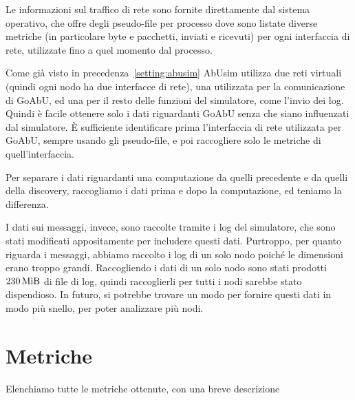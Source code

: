 \documentclass[target=bach]{thud}
\begin{document}
Le informazioni sul traffico di rete sono fornite direttamente dal sistema operativo, che offre degli pseudo-file per processo dove sono listate diverse metriche (in particolare byte e pacchetti, inviati e ricevuti) per ogni interfaccia di rete, utilizzate fino a quel momento dal processo.

Come già visto in precedenza~\ref{setting:abusim} AbUsim utilizza due reti virtuali (quindi ogni nodo ha due interfacce di rete), una utilizzata per la comunicazione di GoAbU, ed una per il resto delle funzioni del simulatore, come l'invio dei log.
Quindi è facile ottenere solo i dati riguardanti GoAbU senza che siano influenzati dal simulatore. È sufficiente identificare prima l'interfaccia di rete utilizzata per GoAbU, sempre usando gli pseudo-file, e poi raccogliere solo le metriche di quell'interfaccia.

Per separare i dati riguardanti una computazione da quelli precedente e da quelli della discovery, raccogliamo i dati prima e dopo la computazione, ed teniamo la differenza.

I dati sui messaggi, invece, sono raccolte tramite i log del simulatore, che sono stati modificati appositamente per includere questi dati.
Purtroppo, per quanto riguarda i messaggi, abbiamo raccolto i log di un solo nodo poiché le dimensioni erano troppo grandi. Raccogliendo i dati di un solo nodo sono stati prodotti $\qty{230}{\mebi\byte}$ di file di log, quindi raccoglierli per tutti i nodi sarebbe stato dispendioso.
In futuro, si potrebbe trovare un modo per fornire questi dati in modo più snello, per poter analizzare più nodi.

\section{Metriche}

Elenchiamo tutte le metriche ottenute, con una breve descrizione
\end{document}
